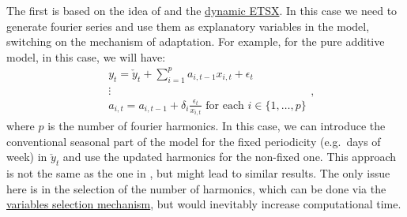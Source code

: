\documentclass[
]{book}
\theoremstyle{definition}
\theoremstyle{definition}
\theoremstyle{definition}
\theoremstyle{definition}
\theoremstyle{remark}
\begin{document}
The first is based on the idea of \citet{DeLivera2010} and the \protect\hyperlink{ETSXDynamic}{dynamic ETSX}. In this case we need to generate fourier series and use them as explanatory variables in the model, switching on the mechanism of adaptation. For example, for the pure additive model, in this case, we will have:
\begin{equation}
  \begin{aligned}
    & {y}_{t} = \check{y}_t + \sum_{i=1}^p a_{i,t-1} x_{i,t} + \epsilon_t \\
    & \vdots \\
    & a_{i,t} = a_{i,t-1} + \delta_i \frac{\epsilon_t}{x_{i,t}} \text{ for each } i \in \{1, \dots, p\}
  \end{aligned},
  \label{eq:ETSXADAMMultipleSeasonalityFourier}
\end{equation}
where \(p\) is the number of fourier harmonics. In this case, we can introduce the conventional seasonal part of the model for the fixed periodicity (e.g.~days of week) in \(\check{y}_t\) and use the updated harmonics for the non-fixed one. This approach is not the same as the one in \citet{DeLivera2010}, but might lead to similar results. The only issue here is in the selection of the number of harmonics, which can be done via the \protect\hyperlink{ETSXSelection}{variables selection mechanism}, but would inevitably increase computational time.
\end{document}
